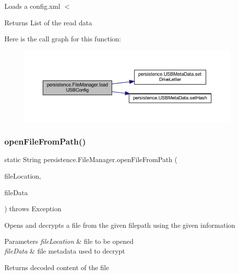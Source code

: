 Loads a config.\+xml $<$ \begin{DoxyReturn}{Returns}
List of the read data 
\end{DoxyReturn}
Here is the call graph for this function\+:\nopagebreak
\begin{figure}[H]
\begin{center}
\leavevmode
\includegraphics[width=350pt]{classpersistence_1_1_file_manager_a5cc9f22a6f81dbba2ff9cbffd9e0c250_cgraph}
\end{center}
\end{figure}
\mbox{\label{classpersistence_1_1_file_manager_adfbb7817aa088a174d2a78be57462e71}} 
\subsubsection{\texorpdfstring{open\+File\+From\+Path()}{openFileFromPath()}}
{\footnotesize\ttfamily static String persistence.\+File\+Manager.\+open\+File\+From\+Path (\begin{DoxyParamCaption}\item[{String}]{file\+Location,  }\item[{\mbox{\hyperlink{classpersistence_1_1_meta_data}{Meta\+Data}}}]{file\+Data }\end{DoxyParamCaption}) throws Exception\hspace{0.3cm}{\ttfamily [static]}}

Opens and decrypts a file from the given filepath using the given information 
\begin{DoxyParams}{Parameters}
{\em file\+Location} & file to be opened \\
\hline
{\em file\+Data} & file metadata used to decrypt \\
\hline
\end{DoxyParams}
\begin{DoxyReturn}{Returns}
decoded content of the file 
\end{DoxyReturn}


